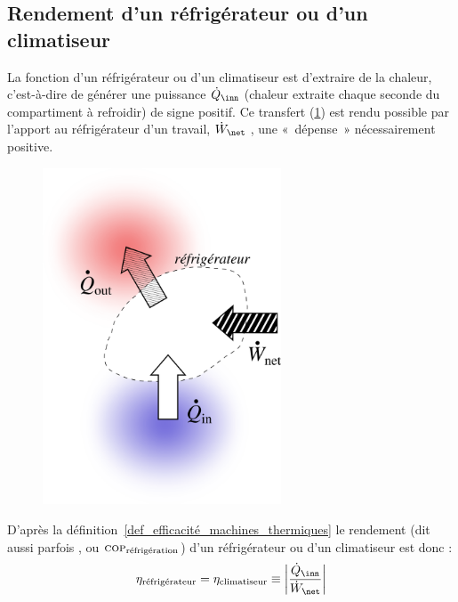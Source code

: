 	\subsection{Rendement d’un réfrigérateur ou d’un climatiseur}
	\label{ch_rendement_réfrigérateur}

		La fonction d’un réfrigérateur ou d’un climatiseur est d’extraire de la chaleur, c’est-à-dire de générer une puissance $\dot Q_\inn$ (chaleur extraite chaque seconde du compartiment à refroidir) de signe positif. Ce transfert (\cref{fig_transferts_réfrigérateur}) est rendu possible par l’apport au réfrigérateur d’un travail, $\dot W_\net$ , une «~dépense~» nécessairement positive.

		\begin{figure}
			\begin{center}
				\includegraphics[height=10cm]{images/efficacite_refrigerateur_climatiseur.png}
			\end{center}
			\label{fig_transferts_réfrigérateur}
		\end{figure}

		D’après la définition~\ref{def_efficacité_machines_thermiques} le rendement (dit aussi parfois , ou $\textsc{cop}_\text{réfrigération}$) d’un réfrigérateur ou d’un climatiseur est donc :
		\begin{equation}
			\eta_\text{réfrigérateur} = \eta _\text{climatiseur} \equiv \left| \frac{\dot Q_\inn}{\dot W_\net} \right|
			\label{def_rendement_climatiseur_refrigerateur}
		\end{equation}


